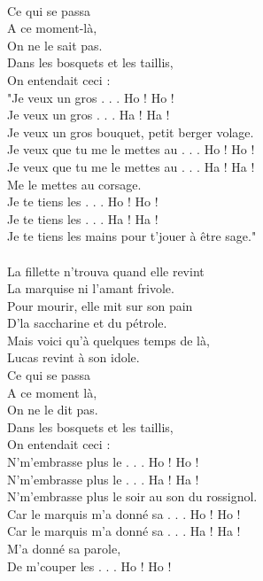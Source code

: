 \\Ce qui se passa
\\A ce moment-là,
\\On ne le sait pas.
\\Dans les bosquets et les taillis,
\\On entendait ceci :
\\"Je veux un gros . . . Ho ! Ho !
\\Je veux un gros . . . Ha ! Ha !
\\Je veux un gros bouquet, petit berger volage.
\\Je veux que tu me le mettes au . . . Ho ! Ho !
\\Je veux que tu me le mettes au . . . Ha ! Ha !
\\Me le mettes au corsage.
\\Je te tiens les . . . Ho ! Ho !
\\Je te tiens les . . . Ha ! Ha !
\\Je te tiens les mains pour t’jouer à être sage."
\\\\La fillette n’trouva quand elle revint
\\La marquise ni l’amant frivole.
\\Pour mourir, elle mit sur son pain
\\D’la saccharine et du pétrole.
\\Mais voici qu’à quelques temps de là,
\\Lucas revint à son idole.
\\Ce qui se passa
\\A ce moment là,
\\On ne le dit pas.
\\Dans les bosquets et les taillis,
\\On entendait ceci :
\\N’m’embrasse plus le . . . Ho ! Ho !
\\N’m’embrasse plus le . . . Ha ! Ha !
\\N’m’embrasse plus le soir au son du rossignol.
\\Car le marquis m’a donné sa . . . Ho ! Ho !
\\Car le marquis m’a donné sa . . . Ha ! Ha !
\\M’a donné sa parole,
\\De m’couper les . . . Ho ! Ho !

\breakpage